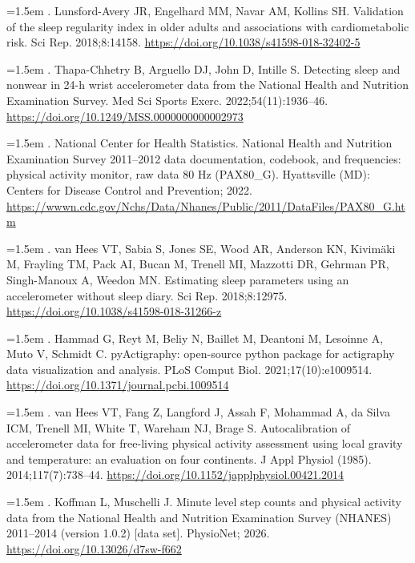 \documentclass[12pt]{article}
\begin{document}
\begin{sloppypar}
\hangindent=1.5em  . Lunsford-Avery JR, Engelhard MM, Navar AM, Kollins SH. Validation of the sleep regularity index in older adults and associations with cardiometabolic risk. Sci Rep. 2018;8:14158. \url{https://doi.org/10.1038/s41598-018-32402-5}

\hangindent=1.5em  . Thapa-Chhetry B, Arguello DJ, John D, Intille S. Detecting sleep and nonwear in 24-h wrist accelerometer data from the National Health and Nutrition Examination Survey. Med Sci Sports Exerc. 2022;54(11):1936--46. \url{https://doi.org/10.1249/MSS.0000000000002973}

\hangindent=1.5em  . National Center for Health Statistics. National Health and Nutrition Examination Survey 2011--2012 data documentation, codebook, and frequencies: physical activity monitor, raw data 80 Hz (PAX80\_G). Hyattsville (MD): Centers for Disease Control and Prevention; 2022. \url{https://wwwn.cdc.gov/Nchs/Data/Nhanes/Public/2011/DataFiles/PAX80_G.htm}

\hangindent=1.5em  . van Hees VT, Sabia S, Jones SE, Wood AR, Anderson KN, Kivim\"aki M, Frayling TM, Pack AI, Bucan M, Trenell MI, Mazzotti DR, Gehrman PR, Singh-Manoux A, Weedon MN. Estimating sleep parameters using an accelerometer without sleep diary. Sci Rep. 2018;8:12975. \url{https://doi.org/10.1038/s41598-018-31266-z}

\hangindent=1.5em  . Hammad G, Reyt M, Beliy N, Baillet M, Deantoni M, Lesoinne A, Muto V, Schmidt C. pyActigraphy: open-source python package for actigraphy data visualization and analysis. PLoS Comput Biol. 2021;17(10):e1009514. \url{https://doi.org/10.1371/journal.pcbi.1009514}

\hangindent=1.5em  . van Hees VT, Fang Z, Langford J, Assah F, Mohammad A, da Silva ICM, Trenell MI, White T, Wareham NJ, Brage S. Autocalibration of accelerometer data for free-living physical activity assessment using local gravity and temperature: an evaluation on four continents. J Appl Physiol (1985). 2014;117(7):738--44. \url{https://doi.org/10.1152/japplphysiol.00421.2014}

\hangindent=1.5em  . Koffman L, Muschelli J. Minute level step counts and physical activity data from the National Health and Nutrition Examination Survey (NHANES) 2011--2014 (version 1.0.2) [data set]. PhysioNet; 2026. \url{https://doi.org/10.13026/d7sw-f662}


\end{sloppypar}
\end{document}
